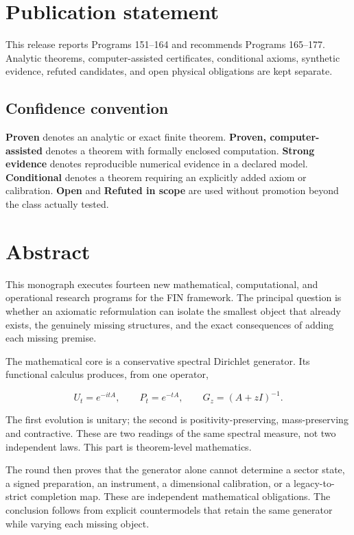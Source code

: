 \documentclass[11pt,a4paper,openany]{report}
\begin{document}
\chapter*{Publication statement}
This release reports Programs 151--164 and recommends Programs 165--177.
Analytic theorems, computer-assisted certificates, conditional axioms,
synthetic evidence, refuted candidates, and open physical obligations are
kept separate.

\tableofcontents
\clearpage
{}

\section{Confidence convention}

\textbf{Proven} denotes an analytic or exact finite theorem. \textbf{Proven, computer-assisted} denotes a theorem with formally enclosed computation. \textbf{Strong evidence} denotes reproducible numerical evidence in a declared model. \textbf{Conditional} denotes a theorem requiring an explicitly added axiom or calibration. \textbf{Open} and \textbf{Refuted in scope} are used without promotion beyond the class actually tested.

\chapter{Abstract}

This monograph executes fourteen new mathematical, computational, and operational research programs for the FIN framework. The principal question is whether an axiomatic reformulation can isolate the smallest object that already exists, the genuinely missing structures, and the exact consequences of adding each missing premise.

The mathematical core is a conservative spectral Dirichlet generator. Its functional calculus produces, from one operator,

\[
U_t=e^{-itA},\qquad P_t=e^{-tA},\qquad
G_z=(A+zI)^{-1}.
\]

The first evolution is unitary; the second is positivity-preserving, mass-preserving and contractive. These are two readings of the same spectral measure, not two independent laws. This part is theorem-level mathematics.

The round then proves that the generator alone cannot determine a sector state, a signed preparation, an instrument, a dimensional calibration, or a legacy-to-strict completion map. These are independent mathematical obligations. The conclusion follows from explicit countermodels that retain the same generator while varying each missing object.
\end{document}

